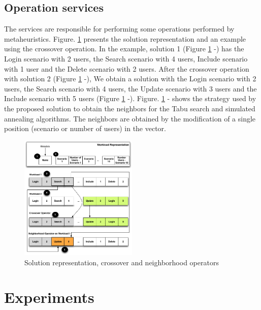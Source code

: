 \subsection{Operation services}

The services are responsible for performing some operations performed by metaheuristics. Figure. \ref{fig:solution} presents the solution representation and an example using the crossover operation. In the example, solution 1 (Figure \ref{fig:solution}  -) has the Login scenario with 2 users, the Search scenario with 4 users, Include scenario with 1 user and the Delete scenario with 2 users.  After the crossover operation with solution 2 (Figure \ref{fig:solution}  -), We obtain a solution with the Login scenario with 2 users, the Search scenario with 4 users, the Update scenario with 3 users and the Include scenario with 5 users (Figure \ref{fig:solution}  -). Figure. \ref{fig:solution} - shows the strategy used by the proposed solution to  obtain the neighbors for the Tabu search and simulated annealing algorithms. The neighbors are obtained by the modification of a single position (scenario or number of users) in the vector.


\begin{figure}[h]
\centering
\includegraphics[width=0.5\textwidth]{./images/genomere.png}
\caption{Solution representation, crossover  and neighborhood operators}
\label{fig:solution}
\end{figure}



\section{Experiments}

